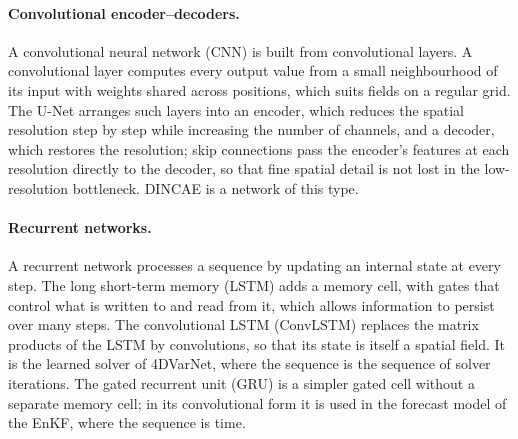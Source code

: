 \documentclass[english, 12pt, a4paper, elec, utf8, a-2b, online]{aaltothesis}
\begin{document}
\paragraph{Convolutional encoder--decoders.}
A convolutional neural network (CNN) is built from convolutional layers. A
convolutional layer computes every output value from a small neighbourhood of
its input with weights shared across positions, which suits fields on a regular
grid. The U-Net \cite{ronneberger2015unet} arranges such layers into an
encoder, which reduces the spatial resolution step by step while increasing the
number of channels, and a decoder, which restores the resolution; skip
connections pass the encoder's features at each resolution directly to the
decoder, so that fine spatial detail is not lost in the low-resolution
bottleneck. DINCAE is a network of this type.

\paragraph{Recurrent networks.}
A recurrent network processes a sequence by updating an internal state at every
step. The long short-term memory (LSTM) \cite{hochreiter1997lstm} adds a memory
cell, with gates that control what is written to and read from it, which allows
information to persist over many steps. The convolutional LSTM (ConvLSTM)
\cite{shi2015convlstm} replaces the matrix products of the LSTM by
convolutions, so that its state is itself a spatial field. It is the learned
solver of 4DVarNet, where the sequence is the sequence of solver iterations.
The gated recurrent unit (GRU) \cite{cho2014gru} is a simpler gated cell
without a separate memory cell; in its convolutional form it is used in the
forecast model of the EnKF, where the sequence is time.
\end{document}
